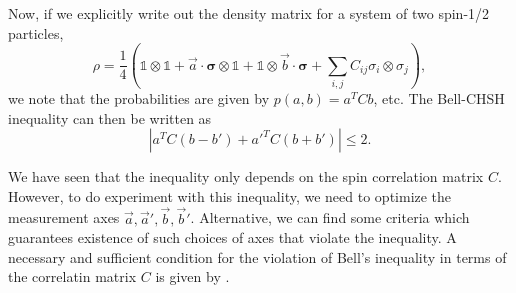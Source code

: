 Now, if we explicitly write out the density matrix for a system of two spin-1/2 particles, 
\[
\rho = \frac{1}{4} \left(\mathbb{1} \otimes \mathbb{1} + \vec a \cdot \bm \sigma \otimes \mathbb{1} + \mathbb{1} \otimes \vec b \cdot \bm \sigma + \sum_{i,j} C_{ij} \sigma_i \otimes \sigma_j \right),
\]
we note that the probabilities are given by $p(a, b) = a^T C b$, etc. The Bell-CHSH inequality can then be written as
\[
|a^T C (b - b') + a'^T C (b + b')| \le 2.
\]

We have seen that the inequality only depends on the spin correlation matrix $C$. However, to do experiment with this inequality, we need to optimize the measurement axes $\vec a, \vec a', \vec b, \vec b'$. Alternative, we can find some criteria which guarantees existence of such choices of axes that violate the inequality. A necessary and sufficient condition for the violation of Bell's inequality in terms of the correlatin matrix $C$ is given by \autocite{horodeckiViolatingBell1995}.


